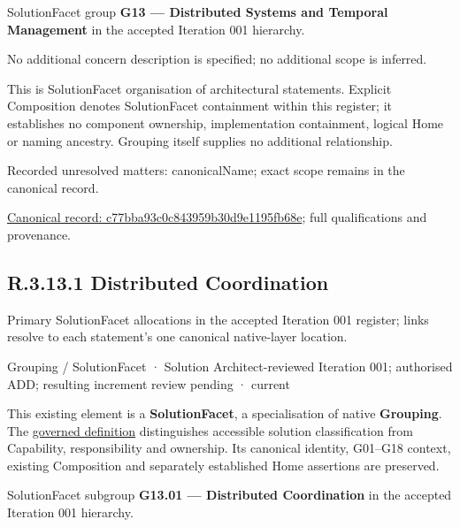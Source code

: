 SolutionFacet group \textbf{G13 — Distributed Systems and Temporal Management} in the accepted Iteration 001 hierarchy.



No additional concern description is specified; no additional scope is inferred.



This is SolutionFacet organisation of architectural statements. Explicit Composition denotes SolutionFacet containment within this register; it establishes no component ownership, implementation containment, logical Home or naming ancestry. Grouping itself supplies no additional relationship.


{\small Recorded unresolved matters: canonicalName; exact scope remains in the canonical record.}\par
{\footnotesize \href{../../../../../../../continuum/grouping/c77bba93c0c843959b30d9e1195fb68e.md}{Canonical record: c77bba93c0c843959b30d9e1195fb68e}; full qualifications and provenance.}\par
\subsection*{R.3.13.1 Distributed Coordination}
\label{navigation:R.3.13.1}

Primary SolutionFacet allocations in the accepted Iteration 001 register; links resolve to each statement’s one canonical native-layer location.\par
\label{element:114a3866dffc4a4cb6aabef39b48fadf}
{\small Grouping / SolutionFacet · Solution Architect-reviewed Iteration 001; authorised ADD; resulting increment review pending · current}\par

This existing element is a \textbf{SolutionFacet}, a specialisation of native
\textbf{Grouping}. The \href{\detokenize{../../../../../../../governance/continuum-representation.md#solutionfacet-classification--1119-candidate}}{governed definition}
distinguishes accessible solution classification from Capability, responsibility
and ownership. Its canonical identity, G01–G18 context, existing Composition
and separately established Home assertions are preserved.



SolutionFacet subgroup \textbf{G13.01 — Distributed Coordination} in the accepted Iteration 001 hierarchy.



